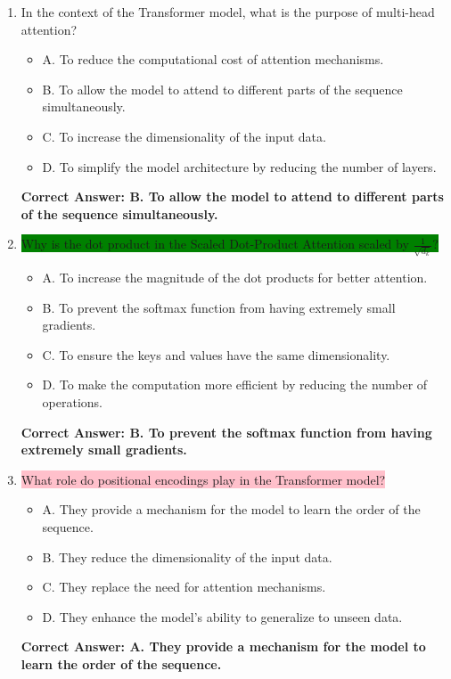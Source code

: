 \begin{figure*}
\begin{tcolorbox}[width=\textwidth,fontupper=\footnotesize,title=Repeated Baseline Questions]
\begin{enumerate}
    \item In the context of the Transformer model, what is the purpose of multi-head attention?
    \begin{itemize}
        \item A. To reduce the computational cost of attention mechanisms.
        \item B. To allow the model to attend to different parts of the sequence simultaneously.
        \item C. To increase the dimensionality of the input data.
        \item D. To simplify the model architecture by reducing the number of layers.
    \end{itemize}
    \textbf{Correct Answer: B. To allow the model to attend to different parts of the sequence simultaneously.}

    \item 
        \colorbox{green}{Why is the dot product in the Scaled Dot-Product Attention scaled by \( \frac{1}{\sqrt{d_k}} \)?}
    \begin{itemize}
        \item A. To increase the magnitude of the dot products for better attention.
        \item B. To prevent the softmax function from having extremely small gradients.
        \item C. To ensure the keys and values have the same dimensionality.
        \item D. To make the computation more efficient by reducing the number of operations.
    \end{itemize}
    \textbf{Correct Answer: B. To prevent the softmax function from having extremely small gradients.}

    \item \colorbox{pink}{What role do positional encodings play in the Transformer model?}
    \begin{itemize}
        \item A. They provide a mechanism for the model to learn the order of the sequence.
        \item B. They reduce the dimensionality of the input data.
        \item C. They replace the need for attention mechanisms.
        \item D. They enhance the model's ability to generalize to unseen data.
    \end{itemize}
    \textbf{Correct Answer: A. They provide a mechanism for the model to learn the order of the sequence.}


\end{enumerate}
\end{tcolorbox}
\end{figure*}
